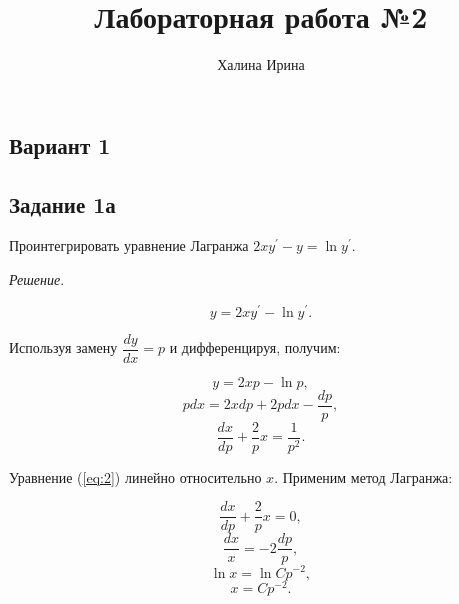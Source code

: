 \documentclass[11pt, a4paper]{article}
\title{Лабораторная работа №2}
\author{Халина Ирина}
\begin{document}
	\par\maketitle
	
	\begin{center}
	\subsection*{Вариант 1}
	\end{center}
	
	\subsection*{Задание 1а}
	
	\par
	Проинтегрировать уравнение Лагранжа $2xy^\prime - y = \ln{y^\prime}$.
	
	\vspace{0.2cm}
	\par
	\textit{Решение}. 
	
	\par
	\begin{equation*}
    	y = 2xy^\prime - \ln{y^\prime}.
	\end{equation*}
	
	\par
	Используя замену $\dfrac{dy}{dx} = p$ и дифференцируя, получим:
	
	\begin{equation}
    	y = 2xp - \ln{p}, \label{eq:1}
	\end{equation}
	\begin{equation*}
    	pdx = 2xdp + 2pdx - \frac{dp}{p},
	\end{equation*}
	\begin{equation}
    	\frac{dx}{dp} + \dfrac{2}{p} x = \dfrac{1}{p^2}.\label{eq:2}
	\end{equation}
	
	\par
	Уравнение (\ref{eq:2}) линейно относительно $x$. Применим метод Лагранжа:
	
	\begin{equation*}
    	\frac{dx}{dp} + \dfrac{2}{p} x = 0,
	\end{equation*}
	\begin{equation*}
    	\frac{dx}{x} = -2 \frac{dp}{p},
	\end{equation*}
	\begin{equation*}
    	\ln{x} = \ln{Cp^{-2}},
	\end{equation*}
	\begin{equation*}
    	x = Cp^{-2}.
	\end{equation*}
	
\end{document}
